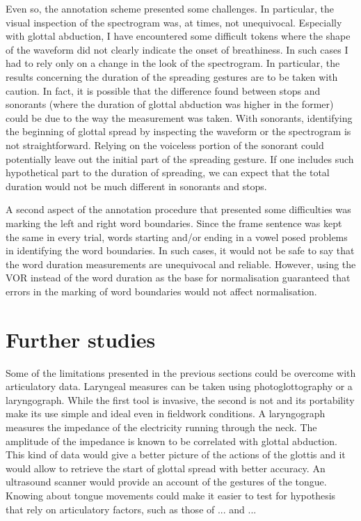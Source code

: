 \documentclass[11pt,a4paper,openany]{memoir}\usepackage[]{graphicx}\usepackage[]{color}
\begin{document}
Even so, the annotation scheme presented some challenges.
In particular, the visual inspection of the spectrogram was, at times, not unequivocal.
Especially with glottal abduction, I have encountered some difficult tokens where the shape of the waveform did not clearly indicate the onset of breathiness.
In such cases I had to rely only on a change in the look of the spectrogram.
In particular, the results concerning the duration of the spreading gestures are to be taken with caution.
In fact, it is possible that the difference found between stops and sonorants (where the duration of glottal abduction was higher in the former) could be due to the way the measurement was taken.
With sonorants, identifying the beginning of glottal spread by inspecting the waveform or the spectrogram is not straightforward.
Relying on the voiceless portion of the sonorant could potentially leave out the initial part of the spreading gesture.
If one includes such hypothetical part to the duration of spreading, we can expect that the total duration would not be much different in sonorants and stops.

A second aspect of the annotation procedure that presented some difficulties was marking the left and right word boundaries.
Since the frame sentence was kept the same in every trial, words starting and/or ending in a vowel posed problems in identifying the word boundaries.
In such cases, it would not be safe to say that the word duration measurements are unequivocal and reliable.
However, using the VOR instead of the word duration as the base for normalisation guaranteed that errors in the marking of word boundaries would not affect normalisation.

\section{Further studies}

Some of the limitations presented in the previous sections could be overcome with articulatory data.
Laryngeal measures can be taken using photoglottography or a laryngograph.
While the first tool is invasive, the second is not and its portability make its use simple and ideal even in fieldwork conditions.
A laryngograph measures the impedance of the electricity running through the neck.
The amplitude of the impedance is known to be correlated with glottal abduction.
This kind of data would give a better picture of the actions of the glottis and it would allow to retrieve the start of glottal spread with better accuracy.
An ultrasound scanner would provide an account of the gestures of the tongue.
Knowing about tongue movements could make it easier to test for hypothesis that rely on articulatory factors, such as those of ... and ...
\end{document}
